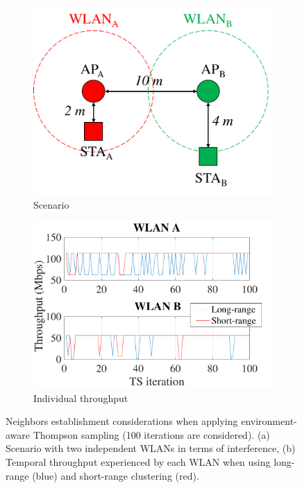 \documentclass{article}
\begin{document}
\begin{figure}[h!]
	\centering   		
	\begin{subfigure}[b]{0.35\textwidth}
		\includegraphics[width=\textwidth]{s2_new}
		\caption{Scenario}
		\label{fig:informed_s1}
	\end{subfigure}
	\begin{subfigure}[b]{0.4\textwidth}
		\includegraphics[width=\textwidth]{clustering_benefits}
		\caption{Individual throughput}
		\label{fig:clustering_benefits}
	\end{subfigure}
	\caption{Neighbors establishment considerations when applying environment-aware Thompson sampling (100 iterations are considered). (a) Scenario with two independent WLANs in terms of interference, (b) Temporal throughput experienced by each WLAN when using long-range (blue) and short-range clustering (red).}
	\label{fig:clustering}
\end{figure}   	
\end{document}
